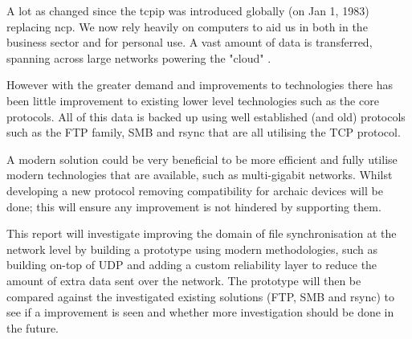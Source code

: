 A lot as changed since the \acrfull{tcpip} was introduced globally (on Jan 1, 1983) replacing \acrfull{ncp}. We now rely heavily on computers to aid us in both in the business sector and for personal use. A vast amount of data is transferred, spanning across large networks powering the "cloud" \parencite{tcpip-transition}.

However with the greater demand and improvements to technologies there has been little improvement to existing lower level technologies such as the core protocols. All of this data is backed up using well established (and old) protocols such as the FTP family, SMB and rsync that are all utilising the TCP protocol.

A modern solution could be very beneficial to be more efficient and fully utilise modern technologies that are available, such as multi-gigabit networks. Whilst developing a new protocol removing compatibility for archaic devices will be done; this will ensure any improvement is not hindered by supporting them.

This report will investigate improving the domain of file synchronisation at the network level by building a prototype using modern methodologies, such as building on-top of UDP and adding a custom reliability layer to reduce the amount of extra data sent over the network. The prototype will then be compared against the investigated existing solutions (FTP, SMB and rsync) to see if a improvement is seen and whether more investigation should be done in the future.

